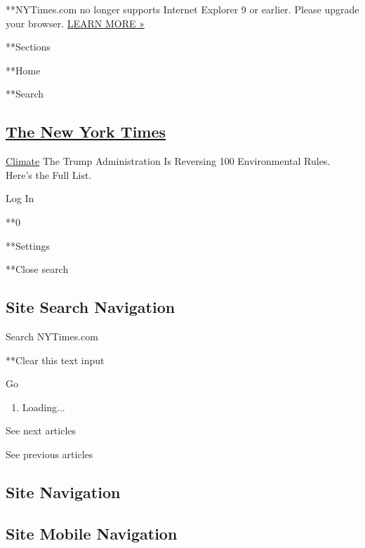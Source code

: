  **NYTimes.com no longer supports Internet Explorer 9 or earlier. Please
upgrade your browser.
\href{http://www.nytimes3xbfgragh.onion/content/help/site/ie9-support.html}{LEARN
MORE »}

**Sections

**Home

**Search

\hypertarget{the-new-york-times}{%
\subsection{\texorpdfstring{\href{http://www.nytimes3xbfgragh.onion/}{The
New York Times}}{The New York Times}}\label{the-new-york-times}}

 \href{/section/climate}{Climate} \textbar{}The Trump Administration Is
Reversing 100 Environmental Rules. Here's the Full List.

Log In

**0

**Settings

**Close search

\hypertarget{site-search-navigation}{%
\subsection{Site Search Navigation}\label{site-search-navigation}}

Search NYTimes.com

**Clear this text input

Go

\href{}{}

\begin{enumerate}
\def\labelenumi{\arabic{enumi}.}
\item
  Loading...
\end{enumerate}

See next articles

See previous articles

\hypertarget{site-navigation}{%
\subsection{Site Navigation}\label{site-navigation}}

\hypertarget{site-mobile-navigation}{%
\subsection{Site Mobile Navigation}\label{site-mobile-navigation}}

